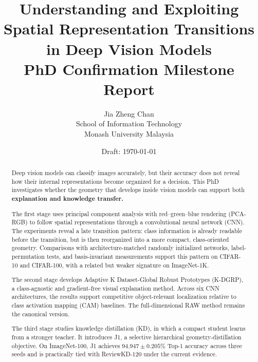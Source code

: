 \documentclass[11pt,a4paper]{article}
\title{Understanding and Exploiting Spatial Representation Transitions\\
in Deep Vision Models\\[0.8em]
\large PhD Confirmation Milestone Report}
\author{Jia Zheng Chan\\
School of Information Technology\\
Monash University Malaysia}
\date{Draft: \today}
\newcommand{\jmethod}{J1}
\begin{document}
\hypersetup{pageanchor=false}
\maketitle

\begin{abstract}
Deep vision models can classify images accurately, but their accuracy does not
reveal how their internal representations become organized for a decision.
This PhD investigates whether the geometry that develops inside vision models
can support both \textbf{explanation and knowledge transfer.}

The first stage uses principal component analysis with red--green--blue
rendering (PCA-RGB) to follow spatial representations through a convolutional
neural network (CNN). The experiments reveal a late transition pattern: class
information is already readable before the transition, but is then reorganized
into a more compact, class-oriented geometry. Comparisons with
architecture-matched randomly initialized networks, label-permutation tests,
and basis-invariant measurements support this pattern on CIFAR-10 and
CIFAR-100, with a related but weaker signature on ImageNet-1K.

The second stage develops Adaptive K Dataset-Global Robust Prototypes
(K-DGRP), a class-agnostic and gradient-free visual explanation method. Across
six CNN architectures, the results support competitive object-relevant
localization relative to class activation mapping (CAM) baselines. The
full-dimensional RAW method remains the canonical version.

The third stage studies knowledge distillation (KD), in which a compact student
learns from a stronger teacher. It introduces \jmethod{}, a selective
hierarchical geometry-distillation objective. On ImageNet-100, \jmethod{}
achieves $94.947\pm0.205\%$ Top-1 accuracy across three seeds and is practically
tied with ReviewKD-120 under the current evidence.
\end{abstract}

\clearpage
\hypersetup{pageanchor=true}
\tableofcontents
\listoffigures
\listoftables
\clearpage

\clearpage
{}













\clearpage
\appendix


\end{document}
